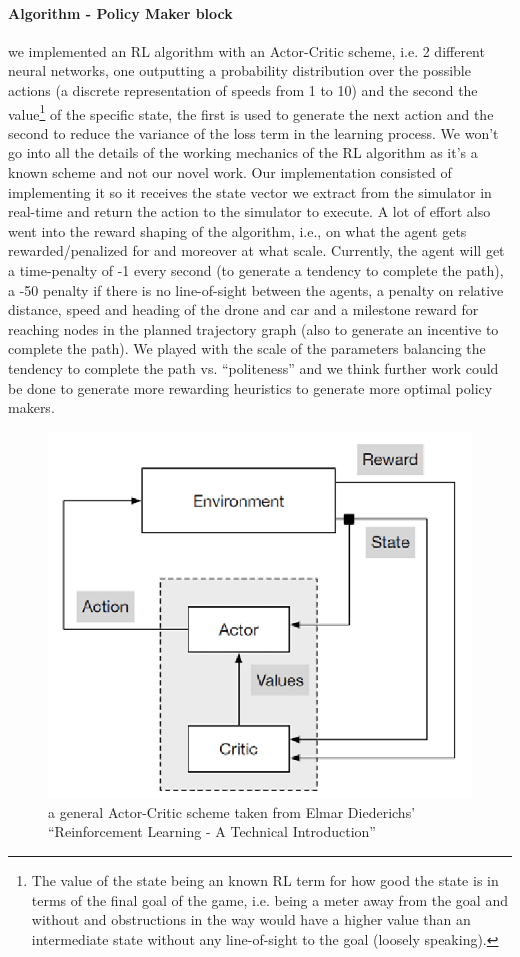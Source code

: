 \documentclass[a4paper,11pt]{article}
\begin{document}
\paragraph{Algorithm - Policy Maker block} we implemented an RL algorithm with an Actor-Critic scheme, i.e. 2 different neural networks, one outputting a probability distribution over the possible actions (a discrete representation of speeds from 1 to 10) and the second the value\footnote{The value of the state being an known RL term for how good the state is in terms of the final goal of the game, i.e. being a meter away from the goal and without and obstructions in the way would have a higher value than an intermediate state without any line-of-sight to the goal (loosely speaking).
} of the specific state, the first is used to generate the next action and the second to reduce the variance of the loss term in the learning process. We won’t go into all the details of the working mechanics of the RL algorithm as it's a known scheme and not our novel work. Our implementation consisted of implementing it so it receives the state vector we extract from the simulator in real-time and return the action to the simulator to execute. A lot of effort also went into the reward shaping of the algorithm, i.e., on what the agent gets rewarded/penalized for and moreover at what scale. Currently, the agent will get a time-penalty of -1 every second (to generate a tendency to complete the path), a -50 penalty if there is no line-of-sight between the agents, a penalty on relative distance, speed and heading of the drone and car and a milestone reward for reaching nodes in the planned trajectory graph (also to generate an incentive to complete the path). We played with the scale of the parameters balancing the tendency to complete the path vs. “politeness” and we think further work could be done to generate more rewarding heuristics to generate more optimal policy makers.


\begin{figure}[h]
    \centering
    \includegraphics[width=.5\textwidth]{A2C.png}
    \caption{a general Actor-Critic scheme taken from Elmar Diederichs’ “Reinforcement Learning - A Technical Introduction”}
    \label{fig:A2C}
\end{figure} 
\end{document}
